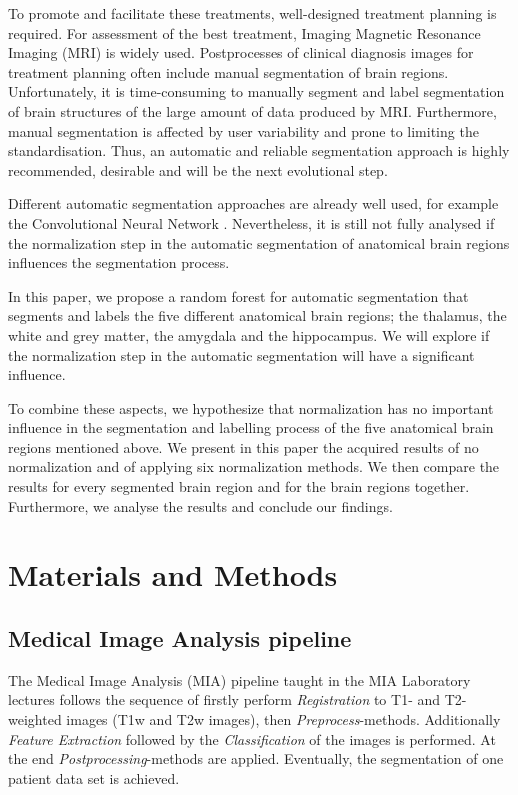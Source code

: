 \documentclass[article]{IEEEtran}
\begin{document}
	
	To promote and facilitate these treatments, well-designed treatment planning is required.
	For assessment of the best treatment, Imaging Magnetic Resonance Imaging (MRI) is widely used. 
	Postprocesses of clinical diagnosis images for treatment planning often include manual segmentation of brain regions. 
	Unfortunately, it is time-consuming to manually segment and label segmentation of brain structures of the large amount of data produced by MRI. 
	Furthermore, manual segmentation is affected by user variability and prone to limiting the standardisation. 
	Thus, an automatic and reliable segmentation approach is highly recommended, desirable and will be the next evolutional step. \cite{Pereira2016} \cite{Brebisson2015}


	Different automatic segmentation approaches are already well used, for example the Convolutional Neural Network \cite{Pereira2016}.
	Nevertheless, it is still not fully analysed if the normalization step in the automatic segmentation of anatomical brain regions influences the segmentation process.
	
	
	In this paper, we propose a random forest for automatic segmentation that segments and labels the five different anatomical brain regions; the thalamus, the white and grey matter, the amygdala and the hippocampus. We will explore if the normalization step in the automatic segmentation will have a significant influence. 
	
	
	To combine these aspects, we hypothesize that normalization has no important influence in the segmentation and labelling process of the five anatomical brain regions mentioned above. 
	We present in this paper the acquired results of no normalization and of applying six normalization methods. 
	We then compare the results for every segmented brain region and for the brain regions together. 
	Furthermore, we analyse the results and conclude our findings. 



\section{Materials and Methods}

\subsection{Medical Image Analysis pipeline}
	The Medical Image Analysis (MIA) pipeline taught in the MIA Laboratory lectures follows the sequence of firstly perform {\itshape Registration} to T1- and T2-weighted images (T1w and T2w images), then {\itshape Preprocess}-methods. Additionally {\itshape Feature Extraction} followed by the {\itshape Classification} of the images is performed. 
	At the end {\itshape Postprocessing}-methods are applied. Eventually, the segmentation of one patient data set is achieved. 
\end{document}
